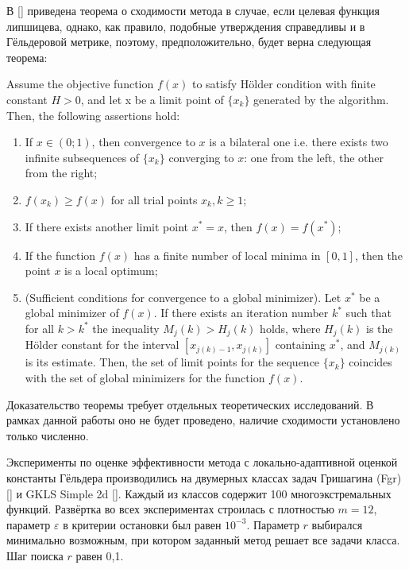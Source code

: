 В [] приведена теорема о сходимости метода в случае, если целевая функция липшицева,
однако, как правило, подобные утверждения справедливы и в Гёльдеровой метрике, поэтому,
предположительно, будет верна следующая теорема:
\begin{hypothesis}
Assume the objective function \(f(x)\) to  satisfy Hölder condition with finite
constant \(H > 0\), and let x be a limit point of \(\{x_k\}\) generated by the algorithm.
Then, the following assertions hold:
\begin{enumerate}
  \item If \(x\in(0;1)\), then convergence to \(x\) is a bilateral one i.e. there
  exists two infinite subsequences of \(\{x_k\}\) converging to \(x\): one from the
  left, the other from the right;
  \item \(f(x_k) \geqslant f(x)\) for all trial points \(x_k, k \geqslant 1\);
  \item If there exists another limit point \(x^* = x\), then \(f(x) = f(x^*)\);
  \item If the function \(f(x)\) has a finite number of local minima in \([0, 1]\),
  then the point \(x\) is a local optimum;
  \item (Sufficient conditions for convergence to a global minimizer). Let \(x^*\)
  be a global minimizer of \(f(x)\). If there exists an iteration number \(k^*\)
  such that for all \(k > k^*\) the inequality
  \(M_j(k) > H_j(k)\) holds, where \(H_j(k)\) is the Hölder constant for the interval
  \([x_{j(k)-1}, x_{j(k)}]\) containing \(x^*\), and \(M_{j(k)}\) is its estimate.
  Then, the set of limit points for the sequence \(\{x_k\}\) coincides with the set
  of global minimizers for the function \(f(x)\).
\end{enumerate}
\end{hypothesis}

Доказательство теоремы требует отдельных теоретических исследований. В рамках данной
работы оно не будет проведено, наличие сходимости установлено только численно.

Эксперименты по оценке эффективности метода с локально-адаптивной оценкой константы
Гёльдера производились на двумерных классах задач Гришагина (Fgr) [] и GKLS Simple 2d [].
Каждый из классов содержит 100 многоэкстремальных функций. Развёртка во всех экспериментах
строилась с плотностью \(m=12\), параметр \(\varepsilon\) в критерии остановки был равен \(10^{-3}\).
Параметр \(r\) выбирался минимально возможным, при котором заданный метод решает все
задачи класса. Шаг поиска \(r\) равен 0,1.

